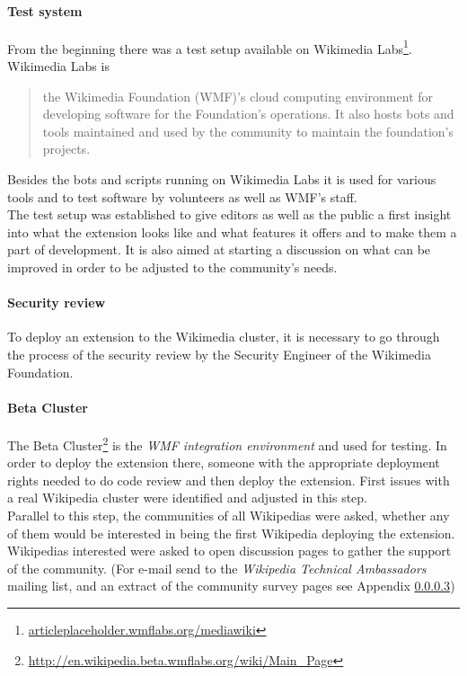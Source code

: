 \paragraph{Test system}
From the beginning there was a test setup available on Wikimedia Labs\footnote{\url{articleplaceholder.wmflabs.org/mediawiki}}. Wikimedia Labs is 
\begin{quotation}
	the Wikimedia Foundation (WMF)'s cloud computing environment for developing software for the Foundation's operations. It also hosts bots and tools maintained and used by the community to maintain the foundation's projects. 
\end{quotation} \citep{wiki:03}
Besides the bots and scripts running on Wikimedia Labs it is used for various tools and to test software by volunteers as well as WMF's staff. \\
The test setup was established to give editors as well as the public a first insight into what the extension looks like and what features it offers and to make them a part of development. It is also aimed at starting a discussion on what can be improved in order to be adjusted to the community's needs.

\paragraph{Security review}
To deploy an extension to the Wikimedia cluster, it is necessary to go through the process of the security review by the Security Engineer of the Wikimedia Foundation. 
  
\paragraph{Beta Cluster}
The Beta Cluster\footnote{\url{http://en.wikipedia.beta.wmflabs.org/wiki/Main_Page}} is the \textit{WMF integration environment} and used for testing. In order to deploy the extension there, someone with the appropriate deployment rights needed to do code review and then deploy the extension. First issues with a real Wikipedia cluster were identified and adjusted in this step. \\
Parallel to this step, the communities of all Wikipedias were asked, whether any of them would be interested in being the first Wikipedia deploying the extension. Wikipedias interested were asked to open discussion pages to gather the support of the community. (For e-mail send to the \textit{Wikipedia Technical Ambassadors} mailing list, and an extract of the community survey pages see Appendix \ref{})

